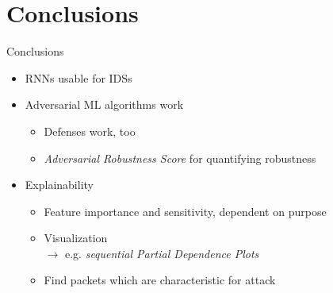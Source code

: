 \documentclass{beamer}
\begin{document}
\section{Conclusions}
\begin{frame}{Conclusions}
\begin{itemize}
\item RNNs usable for IDSs
\item Adversarial ML algorithms work
\begin{itemize}
\item Defenses work, too
\item \textit{Adversarial Robustness Score} for quantifying robustness
\end{itemize}
\item Explainability
\begin{itemize}
\item Feature importance and sensitivity, dependent on purpose 
\item Visualization\\$\rightarrow$ e.g. \textit{sequential Partial Dependence Plots}
\item Find packets which are characteristic for attack
\end{itemize}
\end{itemize}
\end{frame}
\makelastslide
\end{document}
